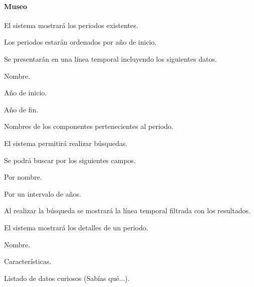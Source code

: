 \paragraph*{Museo}
\begin{myEnumRFM}
	\item El sistema mostrará los periodos existentes.
	\begin{myEnumRFM}
		\item Los periodos estarán ordenados por año de inicio.
		\item Se presentarán en una línea temporal incluyendo los siguientes datos.
		\begin{myEnumRFM}
			\item Nombre.
			\item Año de inicio.
			\item Año de fin.
			\item Nombres de los componentes pertenecientes al periodo.
		\end{myEnumRFM}
	\end{myEnumRFM}
	\item El sistema permitirá realizar búsquedas.
	\begin{myEnumRFM}
		\item Se podrá buscar por los siguientes campos.
		\begin{myEnumRFM}
			\item Por nombre.
			\item Por un intervalo de años.
		\end{myEnumRFM}
		\item Al realizar la búsqueda se mostrará la línea temporal filtrada con los resultados.
	\end{myEnumRFM}
	\item\label{it:detalles_periodo} El sistema mostrará los detalles de un periodo.
	\begin{myEnumRFM}
		\item Nombre.
		\item Características.
		\item Listado de datos curiosos (Sabías qué...).

\end{myEnumRFM}
\end{myEnumRFM}
